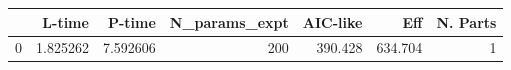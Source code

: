 \begin{tabular}{lrrrrrr}
\toprule
{} &    L-time &    P-time &  N\_params\_expt &  AIC-like &      Eff &  N. Parts \\
\midrule
0 &  1.825262 &  7.592606 &            200 &   390.428 &  634.704 &         1 \\
\bottomrule
\end{tabular}
